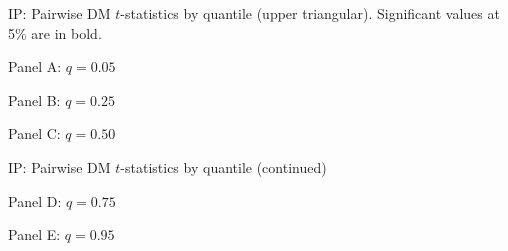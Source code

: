 \documentclass[12pt]{article}
\newcommand{\resultsdate}{2026-02-05}
\begin{document}
\begin{table}[H]
  \centering
  \caption{IP: Pairwise DM $t$-statistics by quantile (upper triangular). Significant values at 5\% are in bold.}
  \label{tab: dm_quantile_ip}

  \begin{subtable}{\textwidth}
    \centering
    \caption*{Panel A: $q=0.05$}
    \resizebox{\textwidth}{!}{
    
    }
  \end{subtable}

  \vspace{0.5em}
  \begin{subtable}{\textwidth}
    \centering
    \caption*{Panel B: $q=0.25$}
    \resizebox{\textwidth}{!}{
    
    }
  \end{subtable}

  \vspace{0.5em}
  \begin{subtable}{\textwidth}
    \centering
    \caption*{Panel C: $q=0.50$}
    \resizebox{\textwidth}{!}{
    
    }
  \end{subtable}

\end{table}

\begin{table}[H]
  \centering
  \caption*{IP: Pairwise DM $t$-statistics by quantile (continued)}

  \begin{subtable}{\textwidth}
    \centering
    \caption*{Panel D: $q=0.75$}
    \resizebox{\textwidth}{!}{
    
    }
  \end{subtable}

  \vspace{0.5em}
  \begin{subtable}{\textwidth}
    \centering
    \caption*{Panel E: $q=0.95$}
    \resizebox{\textwidth}{!}{
    
    }
  \end{subtable}
\end{table}
\end{document}
